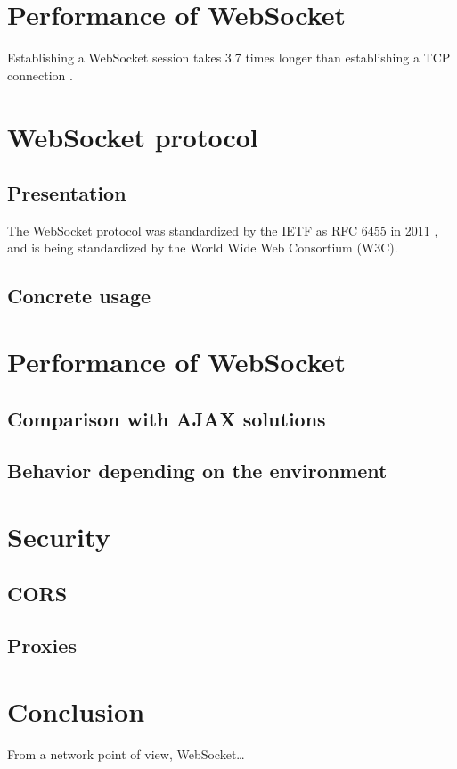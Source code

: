 \documentclass[journal,compsoc]{IEEEtran}
\newcommand{\ws}{WebSocket}
\begin{document}
\section{Performance of WebSocket}

Establishing a \ws{} session takes 3.7 times longer than establishing a TCP connection \cite{performanceEvaluationOfWebsocketProtocol}.


\section{\ws{} protocol}

\subsection{Presentation}
The \ws{} protocol was standardized by the IETF as RFC 6455 in 2011 \cite{rfc6455}, and is being standardized by the World Wide Web Consortium (W3C).

\subsection{Concrete usage}



\section{Performance of \ws}

\subsection{Comparison with AJAX solutions}

\subsection{Behavior depending on the environment}



\section{Security}

\subsection{CORS}

\subsection{Proxies}



\section{Conclusion}

From a network point of view, \ws …


\ifCLASSOPTIONcaptionsoff
  \newpage
\fi




\end{document}

